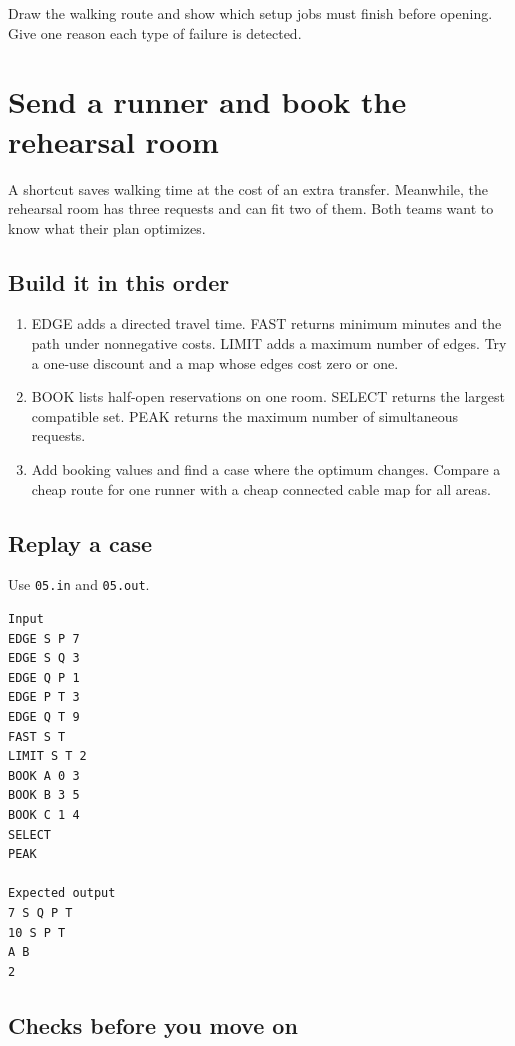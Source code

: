 \documentclass[11pt,letterpaper]{article}
\begin{document}
Draw the walking route and show which setup jobs must finish before opening. Give one reason each type of failure is detected.

\clearpage

\section{Send a runner and book the rehearsal room}\label{festival:05}

A shortcut saves walking time at the cost of an extra transfer. Meanwhile, the rehearsal room has three requests and can fit two of them. Both teams want to know what their plan optimizes.

\subsection*{Build it in this order}

\begin{enumerate}
\item EDGE adds a directed travel time. FAST returns minimum minutes and the path under nonnegative costs. LIMIT adds a maximum number of edges. Try a one-use discount and a map whose edges cost zero or one.
\item BOOK lists half-open reservations on one room. SELECT returns the largest compatible set. PEAK returns the maximum number of simultaneous requests.
\item Add booking values and find a case where the optimum changes. Compare a cheap route for one runner with a cheap connected cable map for all areas.
\end{enumerate}

\subsection*{Replay a case}

Use \texttt{05.in} and \texttt{05.out}.

\begin{samepage}
\small
\begin{verbatim}
Input
EDGE S P 7
EDGE S Q 3
EDGE Q P 1
EDGE P T 3
EDGE Q T 9
FAST S T
LIMIT S T 2
BOOK A 0 3
BOOK B 3 5
BOOK C 1 4
SELECT
PEAK

Expected output
7 S Q P T
10 S P T
A B
2
\end{verbatim}
\end{samepage}

\subsection*{Checks before you move on}
\end{document}
